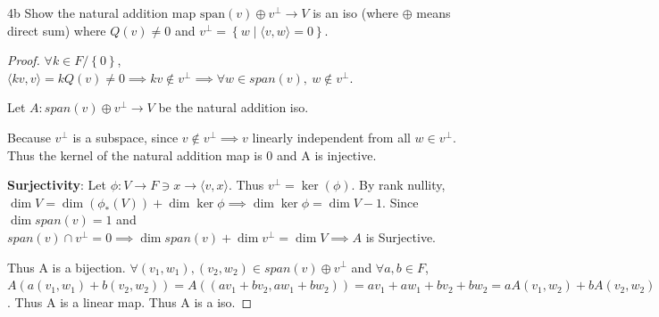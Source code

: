 \documentclass{article}
\newcommand{\angles}[1]{\langle #1 \rangle}
\begin{document}
\begin{claim}{4b}\label{Claim 4b.}
    Show the natural addition map $\text{span}(v) \oplus v^{\perp} \to V$ is an iso (where $\oplus$ means direct sum) where $Q(v) \neq 0$ and $v^\perp = \left\{ w \mid \angles{v, w} = 0 \right\}$.
\end{claim}
\begin{proof}
    $\forall k \in F / \left\{ 0 \right\}$, $\angles{kv, v} = kQ(v) \neq 0 \implies kv \not \in v^\perp \implies \forall w \in span(v),~ w \not \in v^\perp$.
    
    Let $A: span(v) \oplus v^\perp \to V$ be the natural addition iso. 

    Because $v^\perp$ is a subspace, since $v \not \in v^\perp \implies v$ linearly independent from all $w \in v^\perp$. Thus the kernel of the natural addition map is 0 and A is injective.   

    \textbf{Surjectivity}: Let $\phi: V \to F \ni x \to \angles{v, x}$. Thus $v^\perp = \ker(\phi)$. By rank nullity, $\dim V = \dim(\phi_*(V)) + \dim \ker \phi \implies \dim \ker \phi = \dim V - 1$. Since $\dim span(v) = 1$ and $span(v) \cap v^\perp = 0 \implies \dim span(v) + \dim v^\perp = \dim V \implies A$ is Surjective.
    
    Thus A is a bijection. $\forall (v_1, w_1), (v_2, w_2) \in span(v) \oplus v^\perp$ and $\forall a, b\in F$, $A(a(v_1, w_1) + b(v_2, w_2)) = A((av_1 + bv_2, aw_1 + bw_2)) = av_1 + aw_1 + bv_2 + bw_2 = aA(v_1, w_2) + bA(v_2, w_2)$. Thus A is a linear map. Thus A is a iso.     
\end{proof}
\end{document}
